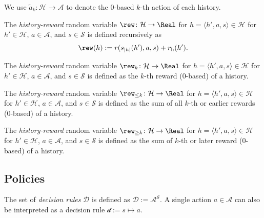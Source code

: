 \begin{definition}
  We use $\tilde{a}_k\colon \mathcal{H} \to \mathcal{A}$ to denote the 0-based $k$-th action of each history.
\end{definition}

\begin{definition} \label{def:reward}
The \emph{history-reward} random variable $\rew\colon \mathcal{H} \to \Real$ for $h = \langle h', a, s \rangle \in  \mathcal{H}$ for $h'\in \mathcal{H}$, $a\in \mathcal{A}$, and $s\in \mathcal{S}$ is defined recursively as
\[
\rew(h) := r(s_{|h|}(h'), a, s) + r_{\mathrm{h}}(h').
\]
\end{definition}

\begin{definition}\label{reward_at}
The \emph{history-reward} random variable $\rew_k \colon \mathcal{H} \to \Real$ for $h = \langle h', a, s \rangle \in  \mathcal{H}$ for $h'\in \mathcal{H}$, $a\in \mathcal{A}$, and $s\in \mathcal{S}$ is defined as the $k$-th reward (0-based) of a history.
\end{definition}

\begin{definition}\label{reward_to}
The \emph{history-reward} random variable $\rew_{\le k} \colon \mathcal{H} \to \Real$ for $h = \langle h', a, s \rangle \in  \mathcal{H}$ for $h'\in \mathcal{H}$, $a\in \mathcal{A}$, and $s\in \mathcal{S}$ is defined as the sum of all $k$-th or earlier rewards (0-based) of a history.
\end{definition}

\begin{definition}\label{reward_from}
The \emph{history-reward} random variable $\rew_{\ge k}\colon \mathcal{H} \to \Real$ for $h = \langle h', a, s \rangle \in  \mathcal{H}$ for $h'\in \mathcal{H}$, $a\in \mathcal{A}$, and $s\in \mathcal{S}$ is defined as the sum of $k$-th or later reward (0-based) of a history.
\end{definition}

\subsection{Policies}

\begin{definition} \label{def:decision-rule}
The set of \emph{decision rules} $\mathcal{D}$ is defined as \(\mathcal{D} := \mathcal{A}^{\mathcal{S}}. \) A single action $a \in \mathcal{A}$ can also be interpreted as a decision rule $\mathcal{d} := s \mapsto a$.
\end{definition}

